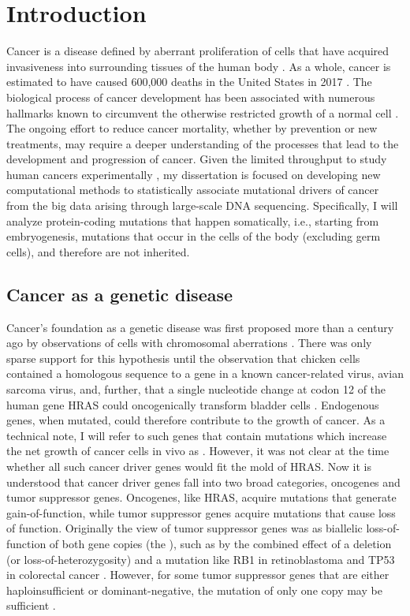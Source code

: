 
\chapter{Introduction}
\label{chap:intro}

Cancer is a disease defined by aberrant proliferation of cells that have acquired invasiveness into surrounding tissues of the human body \cite{RN21}. As a whole, cancer is estimated to have caused 600,000 deaths in the United States in 2017 \cite{RN165}. The biological process of cancer development has been associated with numerous hallmarks known to circumvent the otherwise restricted growth of a normal cell \cite{RN24}. The ongoing effort to reduce cancer mortality, whether by prevention or new treatments, may require a deeper understanding of the processes that lead to the development and progression of cancer. Given the limited throughput to study human cancers experimentally \cite{RN61}, my dissertation is focused on developing new computational methods to statistically associate mutational drivers of cancer from the big data arising through large-scale DNA sequencing. Specifically, I will analyze protein-coding mutations that happen somatically, i.e., starting from embryogenesis, mutations that occur in the cells of the body (excluding germ cells), and therefore are not inherited.

\section{Cancer as a genetic disease}
\label{sec:section}

Cancer's foundation as a genetic disease was first proposed more than a century ago by observations of cells with chromosomal aberrations \cite{RN18}. There was only sparse support for this hypothesis until the observation that chicken cells contained a homologous sequence to a gene in a known cancer-related virus, avian sarcoma virus, \cite{RN20} and, further, that a single nucleotide change at codon 12 of the human gene HRAS could oncogenically transform bladder cells \cite{RN21, RN19}. Endogenous genes, when mutated, could therefore contribute to the growth of cancer. As a technical note, I will refer to such genes that contain mutations which increase the net growth of cancer cells in vivo as . However, it was not clear at the time whether all such cancer driver genes would fit the mold of HRAS.  Now it is understood that cancer driver genes fall into two broad categories, oncogenes and tumor suppressor genes. Oncogenes, like HRAS, acquire mutations that generate gain-of-function, while tumor suppressor genes acquire mutations that cause loss of function. Originally the view of tumor suppressor genes was as biallelic loss-of-function of both gene copies (the \cite{RN22}), such as by the combined effect of a deletion (or loss-of-heterozygosity) and a mutation like RB1 in retinoblastoma \cite{RN23} and TP53 in colorectal cancer \cite{RN1}. However, for some tumor suppressor genes that are either haploinsufficient or dominant-negative, the mutation of only one copy may be sufficient \cite{RN163, RN161, RN162}.

